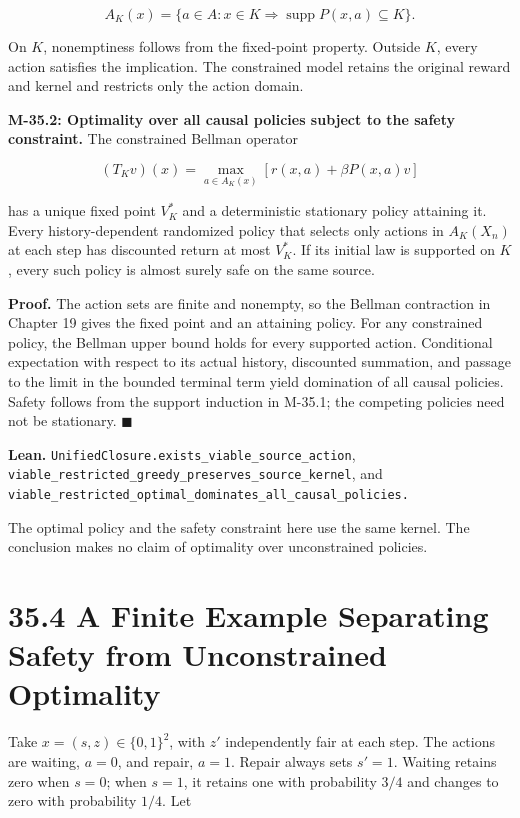 \documentclass[
  english,
  11pt,
  oneside]{book}
\newcounter{none} %
\begin{document}
\[A_K(x)=\{a\in A: x\in K\Rightarrow\operatorname{supp}P(x,a)\subseteq K\}.\]

On \(K\), nonemptiness follows from the fixed-point property. Outside \(K\), every action satisfies the implication. The constrained model retains the original reward and kernel and restricts only the action domain.

\hypertarget{m-35-2}{}\label{m-35-2}

\textbf{M-35.2: Optimality over all causal policies subject to the safety constraint.} The constrained Bellman operator

\[(T_Kv)(x)=\max_{a\in A_K(x)}[r(x,a)+\beta P(x,a)v]\]

has a unique fixed point \(V_K^*\) and a deterministic stationary policy attaining it. Every history-dependent randomized policy that selects only actions in \(A_K(X_n)\) at each step has discounted return at most \(V_K^*\). If its initial law is supported on \(K\), every such policy is almost surely safe on the same source.

\textbf{Proof.} The action sets are finite and nonempty, so the Bellman contraction in Chapter 19 gives the fixed point and an attaining policy. For any constrained policy, the Bellman upper bound holds for every supported action. Conditional expectation with respect to its actual history, discounted summation, and passage to the limit in the bounded terminal term yield domination of all causal policies. Safety follows from the support induction in M-35.1; the competing policies need not be stationary. \(\blacksquare\)

\textbf{Lean.} \nolinkurl{UnifiedClosure.exists_viable_source_action}, \nolinkurl{viable_restricted_greedy_preserves_source_kernel}, and \nolinkurl{viable_restricted_optimal_dominates_all_causal_policies.}

The optimal policy and the safety constraint here use the same kernel. The conclusion makes no claim of optimality over unconstrained policies.

\section{35.4 A Finite Example Separating Safety from Unconstrained Optimality}\label{a-finite-example-separating-safety-from-unconstrained-optimality}

Take \(x=(s,z)\in\{0,1\}^2\), with \(z'\) independently fair at each step. The actions are waiting, \(a=0\), and repair, \(a=1\). Repair always sets \(s'=1\). Waiting retains zero when \(s=0\); when \(s=1\), it retains one with probability \(3/4\) and changes to zero with probability \(1/4\). Let
\end{document}
